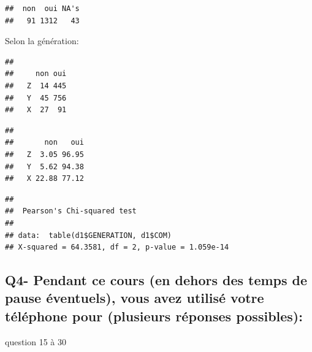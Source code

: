 \documentclass[]{article}
\begin{document}
\begin{verbatim}
##  non  oui NA's 
##   91 1312   43
\end{verbatim}

Selon la génération:

\begin{verbatim}
##    
##     non oui
##   Z  14 445
##   Y  45 756
##   X  27  91
\end{verbatim}

\begin{verbatim}
##    
##       non   oui
##   Z  3.05 96.95
##   Y  5.62 94.38
##   X 22.88 77.12
\end{verbatim}

\begin{verbatim}
## 
##  Pearson's Chi-squared test
## 
## data:  table(d1$GENERATION, d1$COM)
## X-squared = 64.3581, df = 2, p-value = 1.059e-14
\end{verbatim}

\subsection{Q4- Pendant ce cours (en dehors des temps de pause
éventuels), vous avez utilisé votre téléphone pour (plusieurs réponses
possibles):}\label{q4--pendant-ce-cours-en-dehors-des-temps-de-pause-eventuels-vous-avez-utilise-votre-telephone-pour-plusieurs-reponses-possibles}

question 15 à 30
\end{document}
